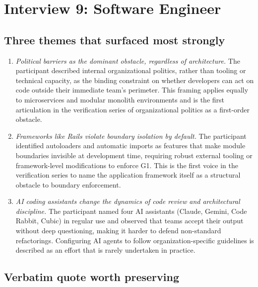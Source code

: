 
\section{Interview 9: Software Engineer}
\label{sec:interview09}

\subsection*{Three themes that surfaced most strongly}

\begin{enumerate}[itemsep=3pt,topsep=2pt]
  \item \emph{Political barriers as the dominant obstacle, regardless of architecture.} The participant described internal organizational politics, rather than tooling or technical capacity, as the binding constraint on whether developers can act on code outside their immediate team's perimeter. This framing applies equally to microservices and modular monolith environments and is the first articulation in the verification series of organizational politics as a first-order obstacle.
  \item \emph{Frameworks like Rails violate boundary isolation by default.} The participant identified autoloaders and automatic imports as features that make module boundaries invisible at development time, requiring robust external tooling or framework-level modifications to enforce G1. This is the first voice in the verification series to name the application framework itself as a structural obstacle to boundary enforcement.
  \item \emph{AI coding assistants change the dynamics of code review and architectural discipline.} The participant named four AI assistants (Claude, Gemini, Code Rabbit, Cubic) in regular use and observed that teams accept their output without deep questioning, making it harder to defend non-standard refactorings. Configuring AI agents to follow organization-specific guidelines is described as an effort that is rarely undertaken in practice.
\end{enumerate}

\subsection*{Verbatim quote worth preserving}

